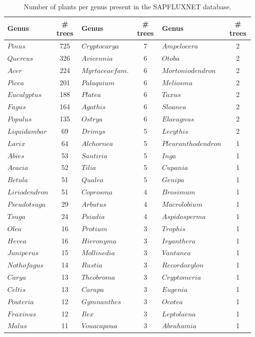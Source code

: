 \documentclass[11pt,twoside]{reedthesis}
\begin{document}
\begin{table}[H]

\caption[Number of plants per genus present in the SAPFLUXNET database.]{\label{tab:tabntreesgenus}Number of plants per genus present in the SAPFLUXNET database.}
\centering
\fontsize{8}{10}\selectfont
\begin{tabular}[t]{lclclc}
\toprule
Genus & \# trees & Genus & \# trees & Genus & \# trees\\
\midrule
$Pinus$ & 725 & $Cryptocarya$ & 7 & $Ampelocera$ & 2\\
$Quercus$ & 326 & $Avicennia$ & 6 & $Otoba$ & 2\\
$Acer$ & 224 & $Myrtaceae fam.$ & 6 & $Mortoniodendron$ & 2\\
$Picea$ & 201 & $Palaquium$ & 6 & $Meliosma$ & 2\\
$Eucalyptus$ & 188 & $Platea$ & 6 & $Taxus$ & 2\\
$Fagus$ & 164 & $Agathis$ & 6 & $Sloanea$ & 2\\
$Populus$ & 135 & $Ostrya$ & 6 & $Elaeagnus$ & 2\\
$Liquidambar$ & 69 & $Drimys$ & 5 & $Lecythis$ & 2\\
$Larix$ & 64 & $Alchornea$ & 5 & $Pleuranthodendron$ & 1\\
$Abies$ & 53 & $Santiria$ & 5 & $Inga$ & 1\\
$Acacia$ & 52 & $Tilia$ & 5 & $Cupania$ & 1\\
$Betula$ & 51 & $Qualea$ & 5 & $Genipa$ & 1\\
$Liriodendron$ & 51 & $Coprosma$ & 4 & $Brosimum$ & 1\\
$Pseudotsuga$ & 29 & $Arbutus$ & 4 & $Macrolobium$ & 1\\
$Tsuga$ & 24 & $Psiadia$ & 4 & $Aspidosperma$ & 1\\
$Olea$ & 16 & $Protium$ & 3 & $Trophis$ & 1\\
$Hevea$ & 16 & $Hieronyma$ & 3 & $Iryanthera$ & 1\\
$Juniperus$ & 15 & $Mollinedia$ & 3 & $Vantanea$ & 1\\
$Nothofagus$ & 14 & $Rustia$ & 3 & $Recordoxylon$ & 1\\
$Carya$ & 13 & $Theobroma$ & 3 & $Cryptomeria$ & 1\\
$Celtis$ & 13 & $Carapa$ & 3 & $Eugenia$ & 1\\
$Pouteria$ & 12 & $Gymnanthes$ & 3 & $Ocotea$ & 1\\
$Fraxinus$ & 12 & $Ilex$ & 3 & $Leptolaena$ & 1\\
$Malus$ & 11 & $Vouacapoua$ & 3 & $Abrahamia$ & 1\\

\end{tabular}
\end{table}
\end{document}
